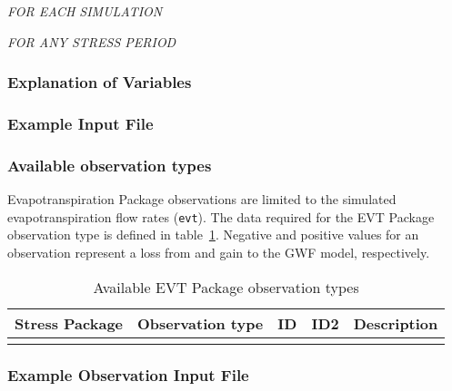\noindent \textit{FOR EACH SIMULATION}


\vspace{5mm}
\noindent \textit{FOR ANY STRESS PERIOD}

\packageperioddescription

\vspace{5mm}
\subsubsection{Explanation of Variables}
\begin{description}

\end{description}

\vspace{5mm}
\subsubsection{Example Input File}


\vspace{5mm}
\subsubsection{Available observation types}
Evapotranspiration Package observations are limited to the simulated evapotranspiration flow rates (\texttt{evt}). The data required for the EVT Package observation type is defined in table~\ref{table:gwf-evtobstype}. Negative and positive values for an observation represent a loss from and gain to the GWF model, respectively.

\begin{longtable}{p{2cm} p{2.75cm} p{2cm} p{1.25cm} p{7cm}}
\caption{Available EVT Package observation types} \tabularnewline

\hline
\hline
\textbf{Stress Package} & \textbf{Observation type} & \textbf{ID} & \textbf{ID2} & \textbf{Description} \\
\hline
\endhead

\hline
\endfoot


\label{table:gwf-evtobstype}
\end{longtable}

\vspace{5mm}
\subsubsection{Example Observation Input File}

